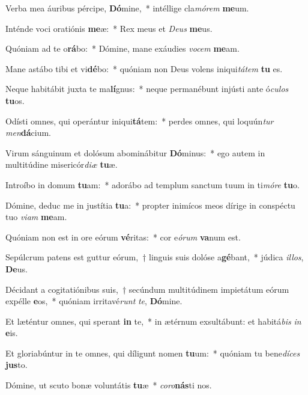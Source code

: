 \item Verba mea áuribus pércipe, \textbf{Dó}mine,~* intéllige cla\textit{mó}\textit{rem} \textbf{me}um.
\item Inténde voci oratiónis \textbf{me}æ:~* Rex meus et \textit{De}\textit{us} \textbf{me}us.
\item Quóniam ad te o\textbf{rá}bo:~* Dómine, mane exáudies \textit{vo}\textit{cem} \textbf{me}am.
\item Mane astábo tibi et vi\textbf{dé}bo:~* quóniam non Deus volens iniqui\textit{tá}\textit{tem} \textbf{tu} es.
\item Neque habitábit juxta te ma\textbf{lí}gnus:~* neque permanébunt injústi ante ó\textit{cu}\textit{los} \textbf{tu}os.
\item Odísti omnes, qui operántur iniqui\textbf{tá}tem:~* perdes omnes, qui loquún\textit{tur} \textit{men}\textbf{dá}cium.
\item Virum sánguinum et dolósum abominábitur \textbf{Dó}minus:~* ego autem in multitúdine misericór\textit{di}\textit{æ} \textbf{tu}æ.
\item Introíbo in domum \textbf{tu}am:~* adorábo ad templum sanctum tuum in ti\textit{mó}\textit{re} \textbf{tu}o.
\item Dómine, deduc me in justítia \textbf{tu}a:~* propter inimícos meos dírige in conspéctu tuo \textit{vi}\textit{am} \textbf{me}am.
\item Quóniam non est in ore eórum \textbf{vé}ritas:~* cor e\textit{ó}\textit{rum} \textbf{va}num est.
\item Sepúlcrum patens est guttur eórum,~† linguis suis dolóse a\textbf{gé}bant,~* júdica \textit{il}\textit{los}, \textbf{De}us.
\item Décidant a cogitatiónibus suis,~† secúndum multitúdinem impietátum eórum expélle \textbf{e}os,~* quóniam irritavé\textit{runt} \textit{te}, \textbf{Dó}mine.
\item Et læténtur omnes, qui sperant \textbf{in} te,~* in ætérnum exsultábunt: et habitá\textit{bis} \textit{in} \textbf{e}is.
\item Et gloriabúntur in te omnes, qui díligunt nomen \textbf{tu}um:~* quóniam tu bene\textit{dí}\textit{ces} \textbf{jus}to.
\item Dómine, ut scuto bonæ voluntátis \textbf{tu}æ~* \textit{co}\textit{ro}\textbf{nás}ti nos.
